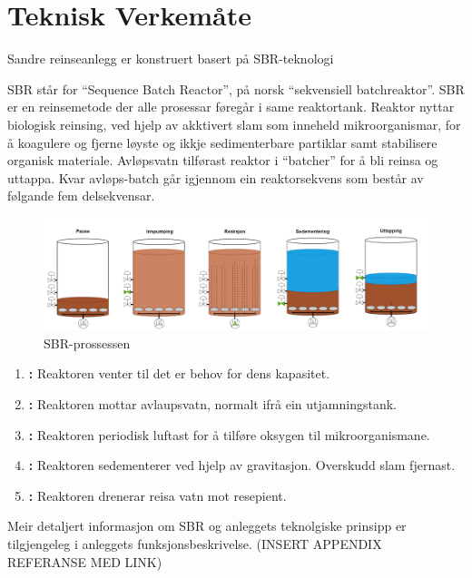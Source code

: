 \newpage
\section{Teknisk Verkemåte}
\thispagestyle{fancy}
Sandre reinseanlegg er konstruert basert på SBR-teknologi

\gls{SBR} står for ``Sequence Batch Reactor'', på norsk ``sekvensiell batchreaktor''.\newline
\gls{SBR} er en reinsemetode der alle prosessar føregår i same reaktortank. 
Reaktor nyttar biologisk reinsing, ved hjelp av akktivert slam som inneheld mikroorganismar, for å koagulere 
og fjerne løyste og ikkje sedimenterbare partiklar samt stabilisere organisk materiale. 
Avløpsvatn tilførast reaktor i ``batcher'' for å bli reinsa og uttappa. 
Kvar avløps-batch går igjennom ein reaktorsekvens som består av følgande fem delsekvensar.
\newline

\begin{figure}[htbp]
    \centering
    \includegraphics[width=1\textwidth]{Figurar/SBR-V2.png}
    \caption{\gls{SBR}-prossessen}\label{fig:SBR-Prosessen}
\end{figure}


\begin{enumerate}
    \item \textbf{:} Reaktoren venter til det er behov for dens kapasitet.
    \item \textbf{:} Reaktoren mottar avlaupsvatn, normalt ifrå ein utjamningstank.
    \item \textbf{:} Reaktoren periodisk luftast for å tilføre oksygen til mikroorganismane.
    \item \textbf{:} Reaktoren sedementerer ved hjelp av gravitasjon. Overskudd slam fjernast.
    \item \textbf{:} Reaktoren drenerar reisa vatn mot resepient.
\end{enumerate}

Meir detaljert informasjon om \gls{SBR} og anleggets teknolgiske prinsipp er tilgjengeleg i anleggets
funksjonsbeskrivelse. (INSERT APPENDIX REFERANSE MED LINK)

